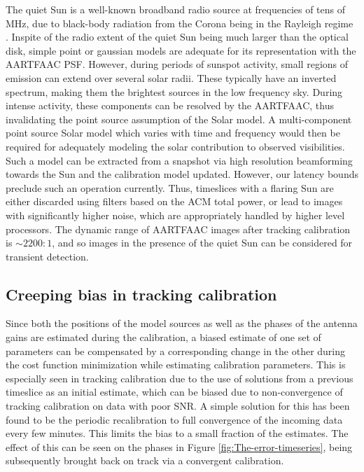\documentclass{aa}
\begin{document}
The quiet Sun  is a well-known broadband radio source at  frequencies of tens of
MHz, due to black-body radiation from  the Corona being in the Rayleigh regime .
Inspite of the radio extent of the  quiet Sun being much larger than the optical
disk, simple point  or gaussian models are adequate  for its representation with
the AARTFAAC PSF.  However, during periods of sunspot activity, small regions of
emission can extend  over several solar radii. These  typically have an inverted
spectrum, making  them the  brightest sources in  the low frequency  sky. During
intense  activity,  these components  can  be  resolved  by the  AARTFAAC,  thus
invalidating the point  source assumption of the Solar  model. A multi-component
point source  Solar model  which varies  with time and  frequency would  then be
required   for  adequately   modeling   the  solar   contribution  to   observed
visibilities. Such a model can be  extracted from a snapshot via high resolution
beamforming towards  the Sun  and the calibration  model updated.   However, our
latency bounds  preclude such an  operation currently.  Thus, timeslices  with a
flaring Sun are either discarded using  filters based on the ACM total power, or
lead to images with significantly  higher noise, which are appropriately handled
by higher level processors. The  dynamic range of AARTFAAC images after tracking
calibration is $\sim2200:1$, and so images  in the presence of the quiet Sun can
be considered for transient detection.


\subsection{Creeping bias in tracking calibration}

Since both  the positions  of the  model sources as  well as  the phases  of the
antenna gains are estimated during the calibration, a biased estimate of one set
of parameters can  be compensated by a corresponding change  in the other during
the cost function minimization  while estimating calibration parameters. This is
especially  seen in  tracking calibration  due to  the use  of solutions  from a
previous  timeslice  as  an  initial  estimate,  which  can  be  biased  due  to
non-convergence  of  tracking calibration  on  data  with  poor SNR.   A  simple
solution  for this  has been  found  to be  the periodic  recalibration to  full
convergence of  the incoming data every few  minutes. This limits the  bias to a
small fraction of the  estimates.  The effect of this can be  seen on the phases
in  Figure \ref{fig:The-error-timeseries},  being  subsequently brought  back  on track  via a  convergent
calibration.
\end{document}
